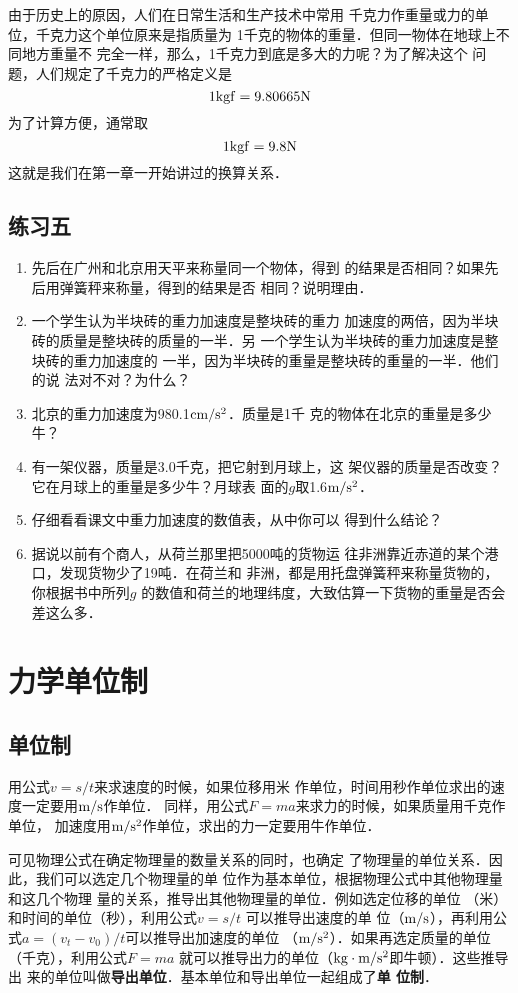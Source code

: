 由于历史上的原因，人们在日常生活和生产技术中常用
千克力作重量或力的单位，千克力这个单位原来是指质量为
1千克的物体的重量．但同一物体在地球上不同地方重量不
完全一样，那么，1千克力到底是多大的力呢？为了解决这个
问题，人们规定了千克力的严格定义是
                  \[1{\rm kgf}=9.80665{\rm N}\]
为了计算方便，通常取
                    \[1{\rm kgf}=9.8{\rm N}\]
这就是我们在第一章一开始讲过的换算关系．

\subsection*{练习五}
\begin{enumerate}
\item 先后在广州和北京用天平来称量同一个物体，得到
的结果是否相同？如果先后用弹簧秤来称量，得到的结果是否
相同？说明理由．
\item 一个学生认为半块砖的重力加速度是整块砖的重力
加速度的两倍，因为半块砖的质量是整块砖的质量的一半．另
一个学生认为半块砖的重力加速度是整块砖的重力加速度的
一半，因为半块砖的重量是整块砖的重量的一半．他们的说
法对不对？为什么？
\item 北京的重力加速度为980.1${\rm cm}/{\rm s^2}$．质量是1千
克的物体在北京的重量是多少牛？
\item 有一架仪器，质量是3.0千克，把它射到月球上，这
架仪器的质量是否改变？它在月球上的重量是多少牛？月球表
面的$g$取1.6$\text{m}/\text{s}^2$．
\item 仔细看看课文中重力加速度的数值表，从中你可以
得到什么结论？
\item 据说以前有个商人，从荷兰那里把5000吨的货物运
往非洲靠近赤道的某个港口，发现货物少了19吨．在荷兰和
非洲，都是用托盘弹簧秤来称量货物的，你根据书中所列$g$
的数值和荷兰的地理纬度，大致估算一下货物的重量是否会
差这么多．
\end{enumerate}

\section{力学单位制}
\subsection{单位制}
用公式$v=s/t$来求速度的时候，如果位移用米
作单位，时间用秒作单位求出的速度一定要用$\text{m}/\text{s}$作单位．
同样，用公式$F=ma$来求力的时候，如果质量用千克作单位，
加速度用$\text{m}/\text{s}^2$作单位，求出的力一定要用牛作单位．

可见物理公式在确定物理量的数量关系的同时，也确定
了物理量的单位关系．因此，我们可以选定几个物理量的单
位作为基本单位，根据物理公式中其他物理量和这几个物理
量的关系，推导出其他物理量的单位．例如选定位移的单位
（米）和时间的单位（秒），利用公式$v=s/t$
可以推导出速度的单
位（$\text{m}/\text{s}$），再利用公式$a=(v_t-v_0)/t$可以推导出加速度的单位
（$\text{m}/\text{s}^2$）．如果再选定质量的单位（千克），利用公式$F=ma$
就可以推导出力的单位（${\rm kg}\cdot \text{m}/\text{s}^2$即牛顿）．这些推导出
来的单位叫做\textbf{导出单位}．基本单位和导出单位一起组成了\textbf{单
位制}．

